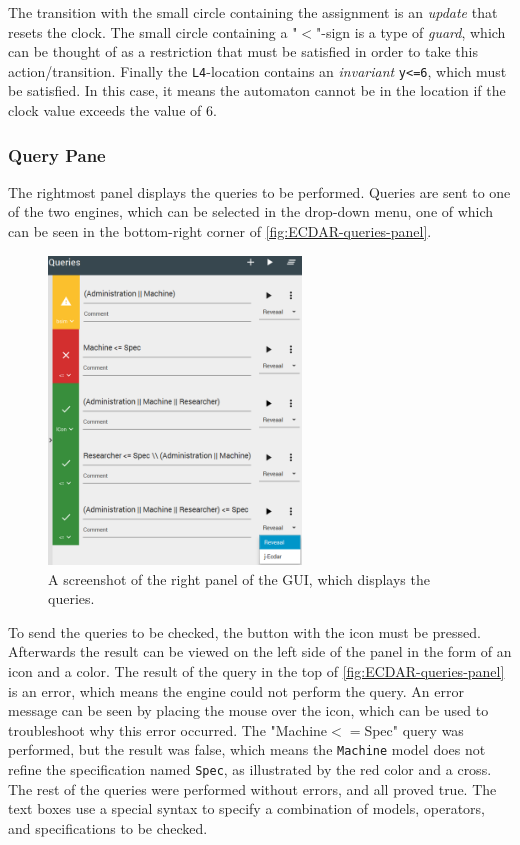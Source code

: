 The transition with the small circle containing the assignment is an \textit{update} that resets the clock.
The small circle containing a "$<$"-sign is a type of \textit{guard}, which can be thought of as a restriction that must be satisfied in order to take this action/transition.
Finally the \texttt{L4}-location contains an \textit{invariant} \texttt{y<=6}, which must be satisfied. 
In this case, it means the automaton cannot be in the location if the clock value exceeds the value of 6.


\subsubsection{Query Pane}
The rightmost panel displays the queries to be performed. 
Queries are sent to one of the two engines, which can be selected in the drop-down menu, one of which can be seen in the bottom-right corner of \autoref{fig:ECDAR-queries-panel}. 
\begin{figure}[H]
    \centering
    \includegraphics[width=0.6\textwidth]{common/figures/right-panel.png}
    \caption{A screenshot of the right panel of the GUI, which displays the queries.}
    \label{fig:ECDAR-queries-panel}
\end{figure}
To send the queries to be checked, the button with the  icon must be pressed.
Afterwards the result can be viewed on the left side of the panel in the form of an icon and a color. 
The result of the query in the top of \autoref{fig:ECDAR-queries-panel} is an error, which means the engine could not perform the query. 
An error message can be seen by placing the mouse over the icon, which can be used to troubleshoot why this error occurred.
The "Machine$<=$Spec" query was performed, but the result was false, which means the \texttt{Machine} model does not refine the specification named \texttt{Spec}, as illustrated by the red color and a cross.
The rest of the queries were performed without errors, and all proved true. 
The text boxes use a special syntax to specify a combination of models, operators, and specifications to be checked.

